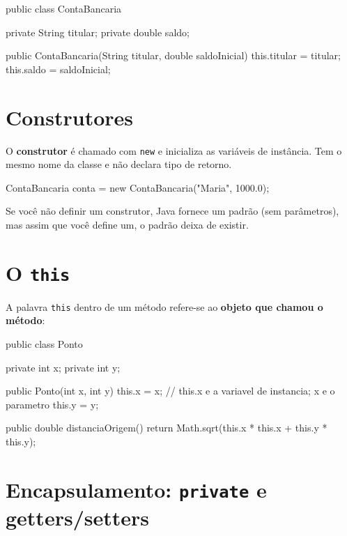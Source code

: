 \documentclass[12pt, a4paper]{article}
\newcommand{\code}[1]{\texttt{\color{javaDeep}#1}}
\begin{document}
\begin{javacode}
public class ContaBancaria {
    private String titular;
    private double saldo;

    public ContaBancaria(String titular, double saldoInicial) {
        this.titular = titular;
        this.saldo = saldoInicial;
    }
}
\end{javacode}

\section{Construtores}

O \textbf{construtor} é chamado com \code{new} e inicializa as variáveis de instância. Tem o mesmo nome da classe e não declara tipo de retorno.

\begin{javacode}
ContaBancaria conta = new ContaBancaria("Maria", 1000.0);
\end{javacode}

\begin{callout}[Importante]
Se você não definir um construtor, Java fornece um padrão (sem parâmetros), mas assim que você define um, o padrão deixa de existir.
\end{callout}

\section{O \texttt{this}}

A palavra \code{this} dentro de um método refere-se ao \textbf{objeto que chamou o método}:

\begin{javacode}
public class Ponto {
    private int x;
    private int y;

    public Ponto(int x, int y) {
        this.x = x; // this.x e a variavel de instancia; x e o parametro
        this.y = y;
    }

    public double distanciaOrigem() {
        return Math.sqrt(this.x * this.x + this.y * this.y);
    }
}
\end{javacode}

\section{Encapsulamento: \texttt{private} e getters/setters}
\end{document}
